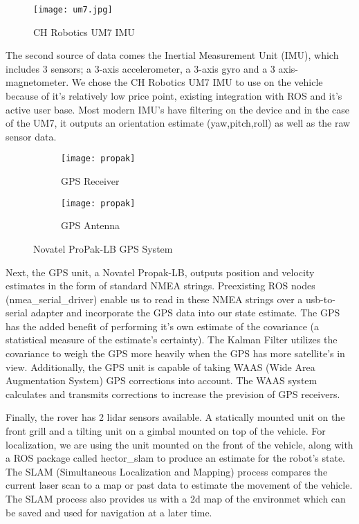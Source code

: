 \begin{figure}[H]
	\centerline{\texttt{[image: um7.jpg]}}
	\caption[]{CH Robotics UM7 IMU}
	\label{fig:imu}
\end{figure}

The second source of data comes the Inertial Measurement Unit (IMU), which includes 3 sensors; a 3-axis accelerometer, a 3-axis gyro and a 3 axis-magnetometer. We chose the CH Robotics UM7 IMU to use on the vehicle because of it's relatively low price point, existing integration with ROS and it's active user base. Most modern IMU's have filtering on the device and in the case of the UM7, it outputs an orientation estimate (yaw,pitch,roll) as well as the raw sensor data. 


\begin{figure}[H]
\centering
\begin{subfigure}{.5\textwidth}
	\centering
	\texttt{[image: propak]}
	\caption{GPS Receiver}
	\label{fig:sub1}
\end{subfigure}%
\begin{subfigure}{.5\textwidth}
	\centering
	\texttt{[image: propak]}
	\caption{GPS Antenna}
	\label{fig:sub2}
\end{subfigure}
\caption{Novatel ProPak-LB GPS System}
\label{fig:test}
\end{figure}

Next, the GPS unit, a Novatel Propak-LB, outputs position and velocity estimates in the form of standard NMEA strings. Preexisting ROS nodes (nmea\_serial\_driver) enable us to read in these NMEA strings over a usb-to-serial adapter and incorporate the GPS data into our state estimate. The GPS has the added benefit of performing it's own estimate of the covariance (a statistical measure of the estimate's certainty). The Kalman Filter utilizes the covariance to weigh the GPS more heavily when the GPS has more satellite's in view. Additionally, the GPS unit is capable of taking WAAS (Wide Area Augmentation System) GPS corrections into account. The WAAS system calculates and transmits corrections to increase the prevision of GPS receivers.


Finally, the rover has 2 lidar sensors available. A statically mounted unit on the front grill and a tilting unit on a gimbal mounted on top of the vehicle. For localization, we are using the unit mounted on the front of the vehicle, along with a ROS package called hector\_slam to produce an estimate for the robot's state. The SLAM (Simultaneous Localization and Mapping) process compares the current laser scan to a map or past data to estimate the movement of the vehicle. The SLAM process also provides us with a 2d map of the environmet which can be saved and used for navigation at a later time.

